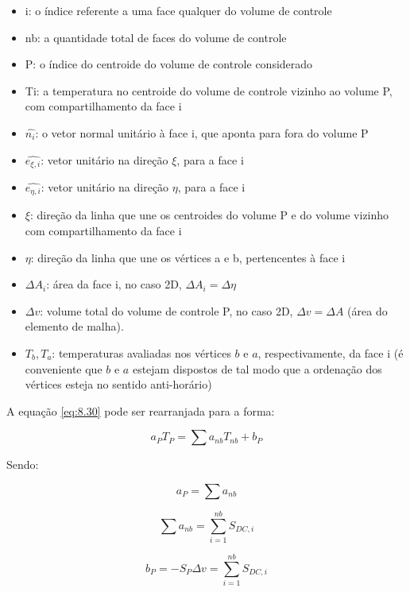 \begin{itemize}
    \item i: o índice referente a uma face qualquer do volume de controle
    \item nb: a quantidade total de faces do volume de controle
    \item P: o índice do centroide do volume de controle considerado
    \item Ti: a temperatura no centroide do volume de controle vizinho ao volume P, com compartilhamento da face i
    \item $\hat{n_i}$: o vetor normal unitário à face i, que aponta para fora do volume P
    \item $\hat{e_{\xi,i}}$: vetor unitário na direção $\xi$, para a face i
    \item $\hat{e_{\eta,i}}$: vetor unitário na direção $\eta$, para a face i
    \item $\xi$: direção da linha que une os centroides do volume P e do volume vizinho com compartilhamento da face i
    \item $\eta$: direção da linha que une os vértices a e b, pertencentes à face i
    \item $\Delta A_i$: área da face i, no caso 2D, $\Delta A_i = \Delta \eta$
    \item $\Delta v$: volume total do volume de controle P, no caso 2D, $\Delta v = \Delta A$ (área do elemento de malha).
    \item $T_b, T_a$: temperaturas avaliadas nos vértices $b$ e $a$, respectivamente, da face i (é conveniente que $b$ e $a$ estejam dispostos de tal modo que a ordenação dos vértices esteja no sentido anti-horário)
\end{itemize}

A equação \ref{eq:8.30} pode ser rearranjada para a forma:

\begin{equation}
    \label{eq:8.33}
    a_P T_P = \sum a_{nb} T_{nb} + b_P
\end{equation}

Sendo:

\begin{equation}
    \label{eq:8.34}
    a_P = \sum a_{nb}
\end{equation}

\begin{equation}
    \label{eq:8.35}
    \sum a_{nb} = \sum_{i=1}^{nb} S_{DC,i}
\end{equation}

\begin{equation}
    \label{eq:8.36}
    b_P = -S_P \Delta v = \sum_{i=1}^{nb} S_{DC,i}
\end{equation}

